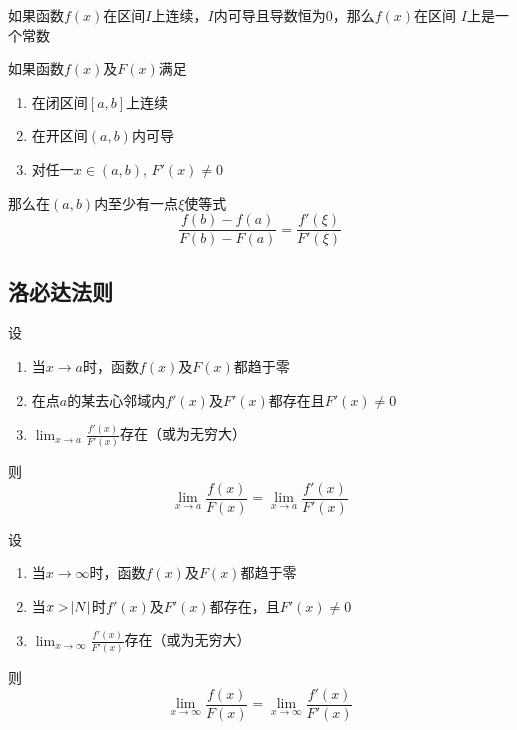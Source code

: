 \documentclass[11pt]{article}
\begin{document}
\begin{theorem}[]
如果函数\(f(x)\)在区间\(I\)上连续，\(I\)内可导且导数恒为0，那么\(f(x)\)在区间
\(I\)上是一个常数
\end{theorem}

\begin{theorem}[柯西中值定理]
如果函数\(f(x)\)及\(F(x)\)满足
\begin{enumerate}
\item 在闭区间\([a,b]\)上连续
\item 在开区间\((a,b)\)内可导
\item 对任一\(x\in(a,b)\), \(F'(x)\neq0\)
\end{enumerate}


那么在\((a,b)\)内至少有一点\(\xi\)使等式
\begin{equation*}
\frac{f(b)-f(a)}{F(b)-F(a)}=\frac{f'(\xi)}{F'(\xi)}
\end{equation*}
\end{theorem}
\subsection{洛必达法则}
\label{sec:org187d40d}
\begin{theorem}[洛必达法则]
设
\begin{enumerate}
\item 当\(x\to a\)时，函数\(f(x)\)及\(F(x)\)都趋于零
\item 在点\(a\)的某去心邻域内\(f'(x)\)及\(F'(x)\)都存在且\(F'(x)\neq0\)
\item \(\lim_{x\to a}\frac{f'(x)}{F'(x)}\)存在（或为无穷大）
\end{enumerate}


则
\begin{equation*}
\lim_{x\to a}\frac{f(x)}{F(x)}=\lim_{x\to a}\frac{f'(x)}{F'(x)}
\end{equation*}
\end{theorem}

\begin{theorem}[]
设
\begin{enumerate}
\item 当\(x\to\infty\)时，函数\(f(x)\)及\(F(x)\)都趋于零
\item 当\(x>\abs{N}\)时\(f'(x)\)及\(F'(x)\)都存在，且\(F'(x)\neq0\)
\item \(\lim_{x\to\infty}\frac{f'(x)}{F'(x)}\)存在（或为无穷大）
\end{enumerate}


则
\begin{equation*}
\lim_{x\to\infty}\frac{f(x)}{F(x)}=\lim_{x\to\infty}\frac{f'(x)}{F'(x)}
\end{equation*}
\end{theorem}
\end{document}
